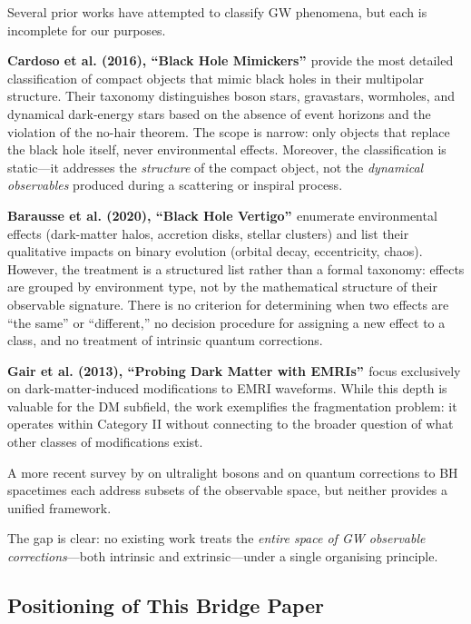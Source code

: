 \documentclass[11pt]{article}
\begin{document}
Several prior works have attempted to classify GW phenomena, but each is incomplete for our purposes.

\textbf{Cardoso et al. (2016), ``Black Hole Mimickers'' \cite{Cardoso:2016vtg}} provide the most detailed classification of compact objects that mimic black holes in their multipolar structure. Their taxonomy distinguishes boson stars, gravastars, wormholes, and dynamical dark-energy stars based on the absence of event horizons and the violation of the no-hair theorem. The scope is narrow: only objects that replace the black hole itself, never environmental effects. Moreover, the classification is static---it addresses the \emph{structure} of the compact object, not the \emph{dynamical observables} produced during a scattering or inspiral process.

\textbf{Barausse et al. (2020), ``Black Hole Vertigo'' \cite{Barausse:2020}} enumerate environmental effects (dark-matter halos, accretion disks, stellar clusters) and list their qualitative impacts on binary evolution (orbital decay, eccentricity, chaos). However, the treatment is a structured list rather than a formal taxonomy: effects are grouped by environment type, not by the mathematical structure of their observable signature. There is no criterion for determining when two effects are ``the same'' or ``different,'' no decision procedure for assigning a new effect to a class, and no treatment of intrinsic quantum corrections.

\textbf{Gair et al. (2013), ``Probing Dark Matter with EMRIs'' \cite{Gair:2013}} focus exclusively on dark-matter-induced modifications to EMRI waveforms. While this depth is valuable for the DM subfield, the work exemplifies the fragmentation problem: it operates within Category II without connecting to the broader question of what other classes of modifications exist.

A more recent survey by \cite{Brito:2020} on ultralight bosons and \cite{Baumgart:2023} on quantum corrections to BH spacetimes each address subsets of the observable space, but neither provides a unified framework.

The gap is clear: no existing work treats the \emph{entire space of GW observable corrections}---both intrinsic and extrinsic---under a single organising principle.

\subsection{Positioning of This Bridge Paper}
\end{document}
